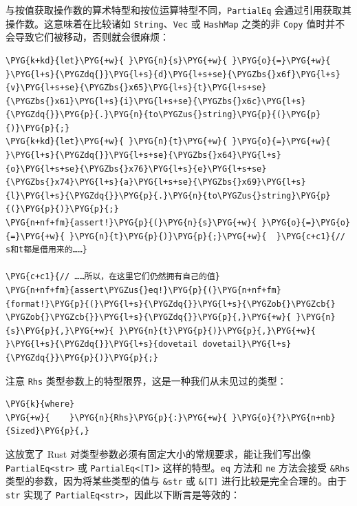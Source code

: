 与按值获取操作数的算术特型和按位运算特型不同，\texttt{PartialEq} 会通过引用获取其操作数。这意味着在比较诸如 \texttt{String}、\texttt{Vec} 或 \texttt{HashMap} 之类的非 \texttt{Copy} 值时并不会导致它们被移动，否则就会很麻烦：

\begin{Verbatim}[commandchars=\\\{\},breaklines=true,breakanywhere=true,fontsize=\codefont,xleftmargin=17bp]
\PYG{k+kd}{let}\PYG{+w}{ }\PYG{n}{s}\PYG{+w}{ }\PYG{o}{=}\PYG{+w}{ }\PYG{l+s}{\PYGZdq{}}\PYG{l+s}{d}\PYG{l+s+se}{\PYGZbs{}x6f}\PYG{l+s}{v}\PYG{l+s+se}{\PYGZbs{}x65}\PYG{l+s}{t}\PYG{l+s+se}{\PYGZbs{}x61}\PYG{l+s}{i}\PYG{l+s+se}{\PYGZbs{}x6c}\PYG{l+s}{\PYGZdq{}}\PYG{p}{.}\PYG{n}{to\PYGZus{}string}\PYG{p}{(}\PYG{p}{)}\PYG{p}{;}
\PYG{k+kd}{let}\PYG{+w}{ }\PYG{n}{t}\PYG{+w}{ }\PYG{o}{=}\PYG{+w}{ }\PYG{l+s}{\PYGZdq{}}\PYG{l+s+se}{\PYGZbs{}x64}\PYG{l+s}{o}\PYG{l+s+se}{\PYGZbs{}x76}\PYG{l+s}{e}\PYG{l+s+se}{\PYGZbs{}x74}\PYG{l+s}{a}\PYG{l+s+se}{\PYGZbs{}x69}\PYG{l+s}{l}\PYG{l+s}{\PYGZdq{}}\PYG{p}{.}\PYG{n}{to\PYGZus{}string}\PYG{p}{(}\PYG{p}{)}\PYG{p}{;}
\PYG{n+nf+fm}{assert!}\PYG{p}{(}\PYG{n}{s}\PYG{+w}{ }\PYG{o}{=}\PYG{o}{=}\PYG{+w}{ }\PYG{n}{t}\PYG{p}{)}\PYG{p}{;}\PYG{+w}{  }\PYG{c+c1}{// s和t都是借用来的……}

\PYG{c+c1}{// ……所以，在这里它们仍然拥有自己的值}
\PYG{n+nf+fm}{assert\PYGZus{}eq!}\PYG{p}{(}\PYG{n+nf+fm}{format!}\PYG{p}{(}\PYG{l+s}{\PYGZdq{}}\PYG{l+s}{\PYGZob{}\PYGZcb{} \PYGZob{}\PYGZcb{}}\PYG{l+s}{\PYGZdq{}}\PYG{p}{,}\PYG{+w}{ }\PYG{n}{s}\PYG{p}{,}\PYG{+w}{ }\PYG{n}{t}\PYG{p}{)}\PYG{p}{,}\PYG{+w}{ }\PYG{l+s}{\PYGZdq{}}\PYG{l+s}{dovetail dovetail}\PYG{l+s}{\PYGZdq{}}\PYG{p}{)}\PYG{p}{;}
\end{Verbatim}

注意 \texttt{Rhs} 类型参数上的特型限界，这是一种我们从未见过的类型：

\begin{Verbatim}[commandchars=\\\{\},breaklines=true,breakanywhere=true,fontsize=\codefont,xleftmargin=17bp]
\PYG{k}{where}
\PYG{+w}{    }\PYG{n}{Rhs}\PYG{p}{:}\PYG{+w}{ }\PYG{o}{?}\PYG{n+nb}{Sized}\PYG{p}{,}
\end{Verbatim}

这放宽了 Rust 对类型参数必须有固定大小的常规要求，能让我们写出像 \texttt{PartialEq<str>} 或 \texttt{PartialEq<[T]>} 这样的特型。\texttt{eq} 方法和 \texttt{ne} 方法会接受 \texttt{\&Rhs} 类型的参数，因为将某些类型的值与 \texttt{\&str} 或 \texttt{\&[T]} 进行比较是完全合理的。由于 \texttt{str} 实现了 \texttt{PartialEq<str>}，因此以下断言是等效的：

